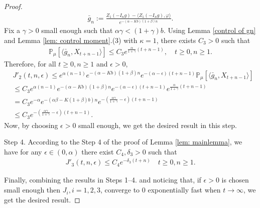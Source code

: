 \documentclass[12pt,a4paper]{amsart}
\theoremstyle{plain}
\theoremstyle{definition}
\numberwithin{equation}{section}
\begin{document}
\begin{proof}
\begin{align}
    \bar{g}_n
    :=\frac{Z_1(-I_ng)-\langle Z_1(-I_ng),\varphi\rangle}{e^{-(\alpha-Kb)(1+\beta)n}}.
\end{align}
    Fix a $\gamma>0$ small enough such that $\alpha \gamma < (1+\gamma)b$.
    Using Lemma \ref{control of gn} and Lemma \ref{lem: control moment}.(3) with $\kappa=1$, there exists $C_3>0$ such that
\begin{align}
    \mathbb{P}_{\mu}[\langle \bar{g}_n, X_{t+n-1}\rangle]
    \leq C_3e^{\frac{\alpha}{1+\gamma}(t+n-1)},\quad t\geq0, n\geq 1.
\end{align}
    Therefore, for all $t\geq 0, n\geq1$ and $\epsilon >0$,
\begin{align}
    &J'_2(t,n,\epsilon)\leq e^{\alpha(n-1)}e^{-(\alpha-Kb)(1+\beta)n}e^{-(\alpha-\epsilon)(t+n-1)}\mathbb{P}_{\mu}[\langle \bar{g}_n, X_{t+n-1}\rangle]\\
    &\leq C_3 e^{\alpha(n-1)}e^{-(\alpha-Kb)(1+\beta)n}e^{-(\alpha-\epsilon)(t+n-1)}e^{\frac{\alpha }{1+\gamma}(t+n-1)}\\
    &=C_3e^{-\alpha}e^{-(\alpha\beta-K(1+\beta)b)n}e^{-(\frac{\alpha\gamma}{1+\gamma}-\epsilon)(t+n-1)}\\&\leq C_3e^{-(\frac{\alpha\gamma}{1+\gamma}-\epsilon)(t+n-1)}.
\end{align}
    Now, by choosing $\epsilon >0$ small enough, we get the desired result in this step.

    Step 4. According to the Step 4 of the proof of  Lemma \ref{lem: mainlemma}, we have for any $\epsilon\in (0,  \alpha)$ there exist $C_4,\delta_3>0$ such that
\begin{align}\label{ineq: control of J31}
    J'_3(t,n,\epsilon)\leq C_4e^{-\delta_3 (t+n)}\quad t\geq0, n\geq 1.
\end{align}

    Finally, combining the results in Steps 1--4. and noticing that, if $\epsilon>0$ is chosen small enough then $J_{i}, i = 1,2,3$, converge to $0$ exponentially fast when $t\rightarrow\infty$, we get the desired result.
\end{proof}
\end{document}

